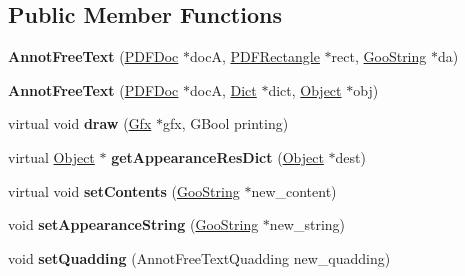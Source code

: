 \subsection*{Public Member Functions}
\begin{DoxyCompactItemize}
\item 
\mbox{\label{class_annot_free_text_a9db75e3d6c21f4bab9a4120fb3bd1bc7}} 
{\bfseries Annot\+Free\+Text} (\hyperlink{class_p_d_f_doc}{P\+D\+F\+Doc} $\ast$docA, \hyperlink{class_p_d_f_rectangle}{P\+D\+F\+Rectangle} $\ast$rect, \hyperlink{class_goo_string}{Goo\+String} $\ast$da)
\item 
\mbox{\label{class_annot_free_text_a451fde9d5ca73d3f9e0e81a23beb4006}} 
{\bfseries Annot\+Free\+Text} (\hyperlink{class_p_d_f_doc}{P\+D\+F\+Doc} $\ast$docA, \hyperlink{class_dict}{Dict} $\ast$dict, \hyperlink{class_object}{Object} $\ast$obj)
\item 
\mbox{\label{class_annot_free_text_a2a721a90f6ac57a00809973371c45ea3}} 
virtual void {\bfseries draw} (\hyperlink{class_gfx}{Gfx} $\ast$gfx, G\+Bool printing)
\item 
\mbox{\label{class_annot_free_text_a1c43a18f00fc8c7a154b91b68f645546}} 
virtual \hyperlink{class_object}{Object} $\ast$ {\bfseries get\+Appearance\+Res\+Dict} (\hyperlink{class_object}{Object} $\ast$dest)
\item 
\mbox{\label{class_annot_free_text_a34c199b2f6e59ec8bc9d6e6e28498b8a}} 
virtual void {\bfseries set\+Contents} (\hyperlink{class_goo_string}{Goo\+String} $\ast$new\+\_\+content)
\item 
\mbox{\label{class_annot_free_text_aa3310fb059abbe8cae208441696a690d}} 
void {\bfseries set\+Appearance\+String} (\hyperlink{class_goo_string}{Goo\+String} $\ast$new\+\_\+string)
\item 
\mbox{\label{class_annot_free_text_aa680888621a6085512a8714f1e8d40ae}} 
void {\bfseries set\+Quadding} (Annot\+Free\+Text\+Quadding new\+\_\+quadding)
\item 
\mbox{\label{class_annot_free_text_ad152b91a8f1e7317971163d35fe5080a}} 

\end{DoxyCompactItemize}
